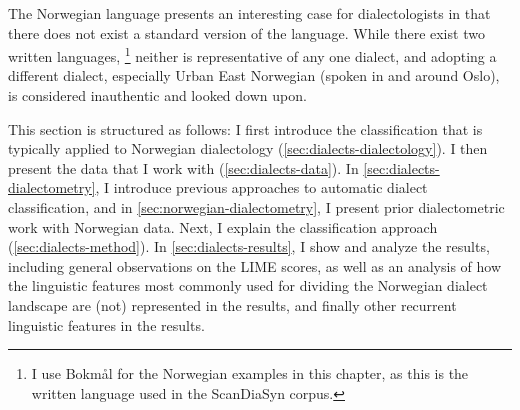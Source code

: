 \label{chap:dialects}

The Norwegian language presents an interesting case for dialectologists in that there does not exist a standard version of the language.
While there exist two written languages,%
\footnote{I use Bokm\aa{}l for the Norwegian examples in this chapter, as this is the written language used in the ScanDiaSyn corpus.}
neither is representative of any one dialect, and adopting a different dialect, especially Urban East Norwegian (spoken in and around Oslo), is considered inauthentic and looked down upon.

This section is structured as follows:
I first introduce the classification that is typically applied to Norwegian dialectology (\autoref{sec:dialects-dialectology}).
I then present the data that I work with (\autoref{sec:dialects-data}).
In \autoref{sec:dialects-dialectometry}, I introduce previous approaches to automatic dialect classification, and in \autoref{sec:norwegian-dialectometry}, I present prior dialectometric work with Norwegian data.
Next, I explain the classification approach (\autoref{sec:dialects-method}).
In \autoref{sec:dialects-results}, I show and analyze the results, including general observations on the LIME scores, as well as an analysis of how the linguistic features most commonly used for dividing the Norwegian dialect landscape are (not) represented in the results, and finally other recurrent linguistic features in the results.
